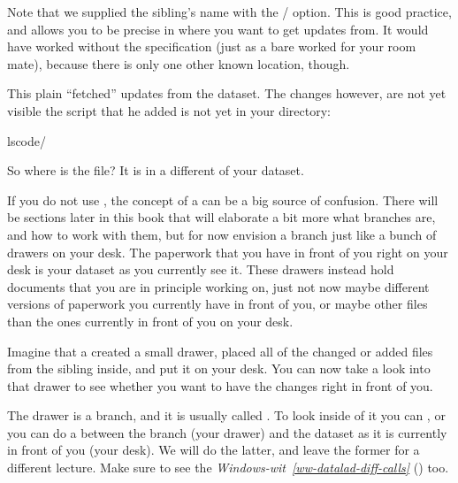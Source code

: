 \sphinxAtStartPar
Note that we supplied the sibling’s name with the / option.
This is good practice, and allows you to be precise in where you want to get
updates from. It would have worked without the specification (just as a bare
 worked for your room mate), because there is only
one other known location, though.

\sphinxAtStartPar
This plain  “fetched” updates from
the dataset. The changes however, are not yet visible \textendash{} the script that
he added is not yet in your  directory:

\begin{sphinxVerbatim}[commandchars=\\\{\}]
lscode/
\end{sphinxVerbatim}

\sphinxAtStartPar
So where is the file? It is in a different  of your dataset.

\sphinxAtStartPar
If you do not use {\hyperref[\detokenize{glossary:term-Git}]{}}, the concept of a {\hyperref[\detokenize{glossary:term-branch}]{}} can be a big
source of confusion. There will be sections later in this book that will
elaborate a bit more what branches are, and how to work with them, but
for now envision a branch just like a bunch of drawers on your desk.
The paperwork that you have in front of you right on your desk is your
dataset as you currently see it.
These drawers instead hold documents that you are in principle working on,
just not now \textendash{} maybe different versions of paperwork you currently have in
front of you, or maybe other files than the ones currently in front of you
on your desk.

\sphinxAtStartPar
Imagine that a  created a small drawer, placed all of
the changed or added files from the sibling inside, and put it on your
desk. You can now take a look into that drawer to see whether you want
to have the changes right in front of you.

\sphinxAtStartPar
The drawer is a branch, and it is usually called .
To look inside of it you can , or you can
do a  between the branch (your drawer) and the dataset as it
is currently in front of you (your desk). We will do the latter, and leave
the former for a different lecture. Make sure to see the
\textit{Windows-wit}~{\windowswiticoninline}\textit{\ref{ww-datalad-diff-calls}} {\hyperref[\detokenize{basics/101-121-siblings:ww-datalad-diff-calls}]{}} () too.

